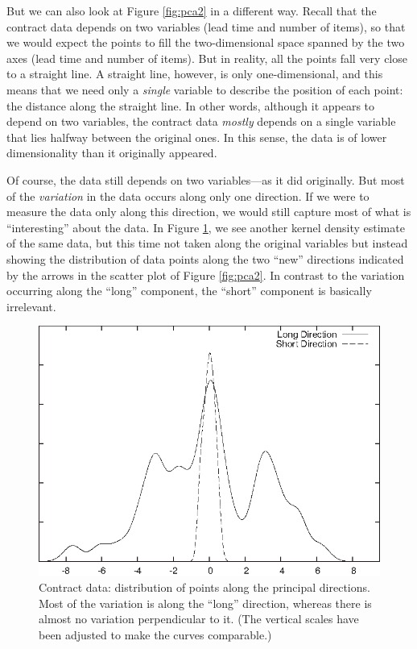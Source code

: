 But we can also look at Figure \ref{fig:pca2} in a different way.
Recall that the contract data depends on two variables (lead time and
number of items), so that we would expect the points to fill the
two-dimensional space spanned by the two axes (lead time and number of
items). But in reality, all the points fall very close to a straight
line. A straight line, however, is only one-dimensional, and this
means that we need only a \emph{single} variable to describe the
position of each point: the distance along the straight line.  In
other words, although it appears to depend on two variables, the
contract data \emph{mostly} depends on a single variable that lies
halfway between the original ones. In this sense, the data is of lower
dimensionality than it originally appeared.

Of course, the data still depends on two variables---as it did
originally.  But most of the \emph{variation} in the data occurs along
only one direction. If we were to measure the data only along this
direction, we would still capture most of what is ``interesting''
about the data.  In Figure \ref{fig:pca3}, we see another kernel
density estimate of the same data, but this time not taken along the
original variables but\vadjust{\pagebreak} instead showing the distribution of data
points along the two ``new'' directions indicated by the arrows in the
scatter plot of Figure \ref{fig:pca2}. In contrast to the variation
occurring along the ``long'' component, the ``short'' component is
basically irrelevant.

\begin{figure}
  \centerline{\includegraphics{img/pca3}}
  \caption{Contract data: distribution of points along the principal
    directions. Most of the variation is along the ``long'' direction,
    whereas there is almost no variation perpendicular to it. (The
    vertical scales have been adjusted to make the curves
    comparable.)}
  \label{fig:pca3}
\end{figure}

